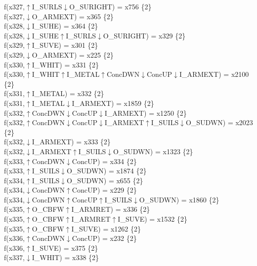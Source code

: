 f(x327,$\uparrow$I\_SURLS$\downarrow$O\_SURIGHT) = x756 \{2\} \\  
f(x327,$\downarrow$O\_ARMEXT) = x365 \{2\} \\  
f(x328,$\downarrow$I\_SUHE) = x364 \{2\} \\  
f(x328,$\downarrow$I\_SUHE$\uparrow$I\_SURLS$\downarrow$O\_SURIGHT) = x329 \{2\} \\  
f(x329,$\uparrow$I\_SUVE) = x301 \{2\} \\  
f(x329,$\downarrow$O\_ARMEXT) = x225 \{2\} \\  
f(x330,$\uparrow$I\_WHIT) = x331 \{2\} \\  
f(x330,$\uparrow$I\_WHIT$\uparrow$I\_METAL$\uparrow$ConcDWN$\downarrow$ConcUP$\downarrow$I\_ARMEXT) = x2100 \{2\} \\  
f(x331,$\uparrow$I\_METAL) = x332 \{2\} \\  
f(x331,$\uparrow$I\_METAL$\downarrow$I\_ARMEXT) = x1859 \{2\} \\  
f(x332,$\uparrow$ConcDWN$\downarrow$ConcUP$\downarrow$I\_ARMEXT) = x1250 \{2\} \\  
f(x332,$\uparrow$ConcDWN$\downarrow$ConcUP$\downarrow$I\_ARMEXT$\uparrow$I\_SUILS$\downarrow$O\_SUDWN) = x2023 \{2\} \\  
f(x332,$\downarrow$I\_ARMEXT) = x333 \{2\} \\  
f(x332,$\downarrow$I\_ARMEXT$\uparrow$I\_SUILS$\downarrow$O\_SUDWN) = x1323 \{2\} \\  
f(x333,$\uparrow$ConcDWN$\downarrow$ConcUP) = x334 \{2\} \\  
f(x333,$\uparrow$I\_SUILS$\downarrow$O\_SUDWN) = x1874 \{2\} \\  
f(x334,$\uparrow$I\_SUILS$\downarrow$O\_SUDWN) = x655 \{2\} \\  
f(x334,$\downarrow$ConcDWN$\uparrow$ConcUP) = x229 \{2\} \\  
f(x334,$\downarrow$ConcDWN$\uparrow$ConcUP$\uparrow$I\_SUILS$\downarrow$O\_SUDWN) = x1860 \{2\} \\  
f(x335,$\uparrow$O\_CBFW$\uparrow$I\_ARMRET) = x336 \{2\} \\  
f(x335,$\uparrow$O\_CBFW$\uparrow$I\_ARMRET$\uparrow$I\_SUVE) = x1532 \{2\} \\  
f(x335,$\uparrow$O\_CBFW$\uparrow$I\_SUVE) = x1262 \{2\} \\  
f(x336,$\uparrow$ConcDWN$\downarrow$ConcUP) = x232 \{2\} \\  
f(x336,$\uparrow$I\_SUVE) = x375 \{2\} \\  
f(x337,$\downarrow$I\_WHIT) = x338 \{2\} \\  
